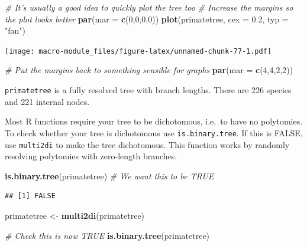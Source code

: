 \documentclass[]{book}
\newenvironment{Shaded}{\begin{snugshade}}{\end{snugshade}}
\newcommand{\KeywordTok}[1]{\textcolor[rgb]{0.13,0.29,0.53}{\textbf{{#1}}}}
\newcommand{\DataTypeTok}[1]{\textcolor[rgb]{0.13,0.29,0.53}{{#1}}}
\newcommand{\DecValTok}[1]{\textcolor[rgb]{0.00,0.00,0.81}{{#1}}}
\newcommand{\FloatTok}[1]{\textcolor[rgb]{0.00,0.00,0.81}{{#1}}}
\newcommand{\StringTok}[1]{\textcolor[rgb]{0.31,0.60,0.02}{{#1}}}
\newcommand{\CommentTok}[1]{\textcolor[rgb]{0.56,0.35,0.01}{\textit{{#1}}}}
\newcommand{\NormalTok}[1]{{#1}}
\begin{document}
\begin{Shaded}
\begin{Highlighting}[]
\CommentTok{# It's usually a good idea to quickly plot the tree too}
\CommentTok{# Increase the margins so the plot looks better}
\KeywordTok{par}\NormalTok{(}\DataTypeTok{mar =} \KeywordTok{c}\NormalTok{(}\DecValTok{0}\NormalTok{,}\DecValTok{0}\NormalTok{,}\DecValTok{0}\NormalTok{,}\DecValTok{0}\NormalTok{))}
\KeywordTok{plot}\NormalTok{(primatetree, }\DataTypeTok{cex =} \FloatTok{0.2}\NormalTok{, }\DataTypeTok{typ =} \StringTok{"fan"}\NormalTok{)}
\end{Highlighting}
\end{Shaded}

\texttt{[image: macro-module\_files/figure-latex/unnamed-chunk-77-1.pdf]}

\begin{Shaded}
\begin{Highlighting}[]
\CommentTok{# Put the margins back to something sensible for graphs}
\KeywordTok{par}\NormalTok{(}\DataTypeTok{mar =} \KeywordTok{c}\NormalTok{(}\DecValTok{4}\NormalTok{,}\DecValTok{4}\NormalTok{,}\DecValTok{2}\NormalTok{,}\DecValTok{2}\NormalTok{))}
\end{Highlighting}
\end{Shaded}

\texttt{primatetree} is a fully resolved tree with branch lengths. There
are 226 species and 221 internal nodes.

Most R functions require your tree to be dichotomous, i.e.~to have no
polytomies. To check whether your tree is dichotomous use
\texttt{is.binary.tree}. If this is FALSE, use \texttt{multi2di} to make
the tree dichotomous. This function works by randomly resolving
polytomies with zero-length branches.

\begin{Shaded}
\begin{Highlighting}[]
\KeywordTok{is.binary.tree}\NormalTok{(primatetree) }\CommentTok{# We want this to be TRUE}
\end{Highlighting}
\end{Shaded}

\begin{verbatim}
## [1] FALSE
\end{verbatim}

\begin{Shaded}
\begin{Highlighting}[]
\NormalTok{primatetree <-}\StringTok{ }\KeywordTok{multi2di}\NormalTok{(primatetree)}

\CommentTok{# Check this is now TRUE}
\KeywordTok{is.binary.tree}\NormalTok{(primatetree)}
\end{Highlighting}
\end{Shaded}
\end{document}
